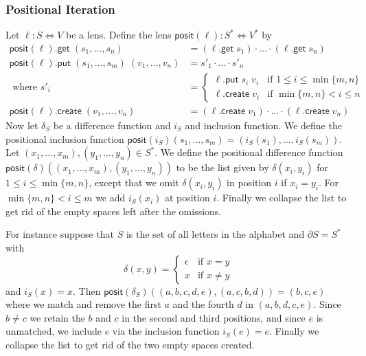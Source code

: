\documentclass[acmsmall,review,anonymous]{acmart}\settopmatter{printfolios=true,printccs=false,printacmref=false}
\newcommand{\kw}[1]{\ensuremath{\mathsf{#1}}}
\newcommand{\get}{\ensuremath{\kw{get}}}
\newcommand{\pput}{\ensuremath{\kw{put}}}
\newcommand{\create}{\ensuremath{\kw{create}}}
\newcommand{\pos}{\ensuremath{\kw{posit}}}
\begin{document}
\subsubsection{Positional Iteration}
Let $\ell: S \Leftrightarrow V$ be a lens. Define the lens $\pos(\ell):
S^* \Leftrightarrow V^*$ by
\begin{align*}
\pos(\ell) .\get \; (s_1, \ldots, s_n) &= (\ell.\get \; s_1) \cdot \ldots \cdot
(\ell.\get \; s_n)\\
\pos(\ell) .\pput \; (s_1, \ldots, s_m) \; (v_1, \ldots, v_n) &= s'_1 \cdot
\ldots \cdot s'_n\\
\text{ where } s'_i &= \begin{cases}
\ell.\pput \; s_i \; v_i & \text{if } 1 \leq i \leq \min\{m, n\}\\
\ell.\create \; v_i & \text{if } \min\{m, n\} < i \leq n
\end{cases}\\
\pos(\ell).\create \; (v_1, \ldots, v_n) &= (\ell.\create \; v_1) \cdot \ldots
\cdot (\ell.\create \; v_n)
\end{align*}
Now let $\delta_S$ be a difference function and $i_S$ and inclusion function.
We define the positional inclusion function $\pos(i_S)(s_1, \ldots, s_m) =
(i_S(s_1), \ldots, i_S(s_m))$. Let $(x_1, \ldots, x_m), (y_1, \ldots, y_n) \in
S^*$. We define the positional difference function $\pos(\delta)((x_1, \ldots,
x_m), (y_1, \ldots, y_n))$ to be the list given by $\delta(x_i, y_i)$ for $1
\leq i \leq \min\{m, n\}$, except that we omit $\delta(x_i, y_i)$ in position
$i$ if $x_i = y_i$. For $\min\{m, n\} < i \leq m$ we add $i_S(x_i)$ at position
$i$. Finally we collapse the list to get rid of the empty spaces left after the
omissions.

For instance suppose that $S$ is the set of all letters in the alphabet and
$\partial S = S^*$ with $$\delta(x, y) =
\begin{cases}
\epsilon & \text{if } x = y\\
x & \text{if } x \neq y
\end{cases}$$
and $i_S(x) = x$. Then $\pos(\delta_S)((a, b, c, d, e), (a, c, b, d)) = (b, c,
e)$ where we match and remove the first $a$ and the fourth $d$ in $(a, b, d, c,
e)$. Since $b \neq c$ we retain the $b$ and $c$ in the second and third
positions, and since $e$ is unmatched, we include $e$ via the inclusion
function $i_S(e) = e$. Finally we collapse the list to get rid of the two empty
spaces created.
\end{document}
